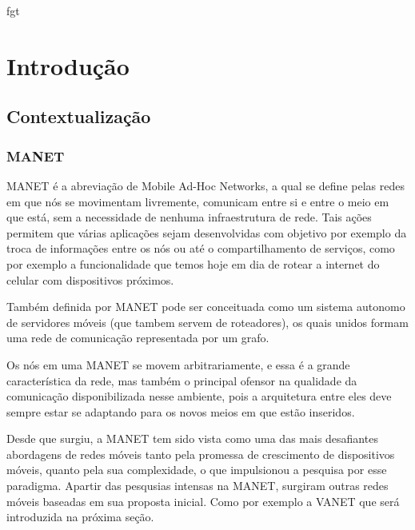 fgt\documentclass[12pt, %
openright, 
oneside, %
a4paper,    %
brazil]{facom-ufu-abntex2}
\begin{document}
\tableofcontents*
\cleardoublepage





\textual



\chapter{Introdução}
\section{Contextualização}
\subsection{MANET}
MANET é a abreviação de Mobile Ad-Hoc Networks, a qual se define pelas redes em que nós se movimentam livremente, comunicam entre si e entre o meio em que está, sem a necessidade de nenhuma infraestrutura de rede. Tais ações permitem que várias aplicações sejam desenvolvidas com objetivo por exemplo da troca de informações entre os nós ou até o compartilhamento de serviços, como por exemplo a funcionalidade que temos hoje em dia de rotear a internet do celular com dispositivos próximos.

Também definida por  MANET pode ser conceituada como um sistema autonomo de servidores móveis (que tambem servem de roteadores), os quais unidos formam uma rede de comunicação representada por um grafo.

Os nós em uma MANET se movem arbitrariamente, e essa é a grande característica da rede, mas também o principal ofensor na qualidade da comunicação disponibilizada nesse ambiente, pois a arquitetura entre eles deve sempre estar se adaptando para os novos meios em que estão inseridos.

Desde que surgiu, a MANET tem sido vista como uma das mais desafiantes abordagens de redes móveis tanto pela promessa de crescimento de dispositivos móveis, quanto pela sua complexidade, o que impulsionou a pesquisa por esse paradigma. Apartir das pesqusias intensas na MANET, surgiram outras redes móveis baseadas em sua proposta inicial. Como por exemplo a VANET que será introduzida na próxima seção.
\end{document}
